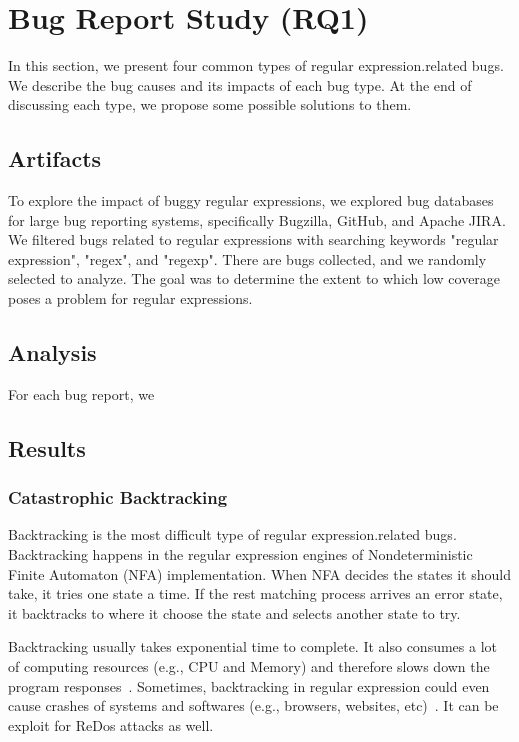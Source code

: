 \section{Bug Report Study (RQ1)}
\label{sec:rq1}
In this section, we present four common types of regular expression.related bugs. We describe the bug causes and its impacts of each bug type. At the end of discussing each type, we propose some possible solutions to them.

\subsection{Artifacts}
 To explore the impact of buggy regular expressions, we explored bug databases for large bug reporting systems, specifically Bugzilla, GitHub, and Apache JIRA.
  We filtered bugs related to regular expressions with searching keywords "regular expression", "regex", and "regexp". 
  There are  bugs collected, and we randomly selected  to analyze. The goal was to determine the extent to which low coverage poses a problem for regular expressions. 
  
  \subsection{Analysis}
  For each bug report, we 

\subsection{Results}
\subsubsection{Catastrophic Backtracking}
Backtracking is the most difficult type of regular expression.related bugs. Backtracking happens in the regular expression engines of Nondeterministic Finite Automaton (NFA) implementation. When NFA decides the states it should take, it tries one state a time. If the rest matching process arrives an error state, it backtracks to where it choose the state and selects another state to try.

 Backtracking usually takes exponential time to complete. It also consumes a lot of computing resources (e.g., CPU and Memory) and therefore slows down the program responses~\cite{stackoverflow}. Sometimes, backtracking in regular expression could even cause crashes of systems and softwares (e.g., browsers, websites, etc)~\cite{browser}. It can be exploit for ReDos attacks as well.

